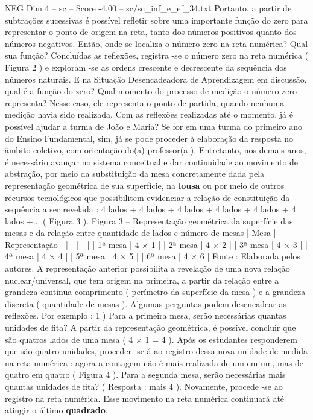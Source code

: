 \begin{textsample}{NEG Dim 4 – sc – Score -4.00 – sc/sc\_inf\_e\_ef\_34.txt}
Portanto, a partir de subtrações sucessivas é possível refletir sobre uma importante função do zero para representar o ponto de origem na reta, tanto dos números positivos quanto dos números negativos.
Então, onde se localiza o número zero na reta numérica?
Qual sua função?
Concluídas as reflexões, registra -se o número zero na reta numérica ( Figura 2 ) e exploram -se as ordens crescente e decrescente da sequência dos números naturais.
E na Situação Desencadeadora de Aprendizagem em discussão, qual é a função do zero?
Qual momento do processo de medição o número zero representa?
Nesse caso, ele representa o ponto de partida, quando nenhuma medição havia sido realizada.
Com as reflexões realizadas até o momento, já é possível ajudar a turma de João e Maria?
Se for em uma turma do primeiro ano do Ensino Fundamental, sim, já se pode proceder à elaboração da resposta no âmbito coletivo, com orientação do(a) professor(a ).
Entretanto, nos demais anos, é necessário avançar no sistema conceitual e dar continuidade ao movimento de abstração, por meio da substituição da mesa concretamente dada pela representação geométrica de sua superfície, na \textbf{lousa} ou por meio de outros recursos tecnológicos que possibilitem evidenciar a relação de constituição da sequência a ser revelada : 4 lados + 4 lados + 4 lados + 4 lados + 4 lados + 4 lados +... ( Figura 3 ).
Figura 3 – Representação geométrica da superfície das mesas e da relação entre quantidade de lados e número de mesas | Mesa | Representação | |---|---| | 1ª mesa | 4 × 1 | | 2ª mesa | 4 × 2 | | 3ª mesa | 4 × 3 | | 4ª mesa | 4 × 4 | | 5ª mesa | 4 × 5 | | 6ª mesa | 4 × 6 | Fonte : Elaborada pelos autores.
A representação anterior possibilita a revelação de uma nova relação nuclear/universal, que tem origem na primeira, a partir da relação entre a grandeza contínua comprimento ( perímetro da superfície da mesa ) e a grandeza discreta ( quantidade de mesas ).
Algumas perguntas podem desencadear as reflexões.
Por exemplo : 1 ) Para a primeira mesa, serão necessárias quantas unidades de fita?
A partir da representação geométrica, é possível concluir que são quatros lados de uma mesa ( 4 × 1 = 4 ).
Após os estudantes responderem que são quatro unidades, proceder -se-á ao registro dessa nova unidade de medida na reta numérica : agora a contagem não é mais realizada de um em um, mas de quatro em quatro ( Figura 4 ).
Para a segunda mesa, serão necessárias mais quantas unidades de fita? ( Resposta : mais 4 ).
Novamente, procede -se ao registro na reta numérica.
Esse movimento na reta numérica continuará até atingir o último \textbf{quadrado}.

\end{textsample}
